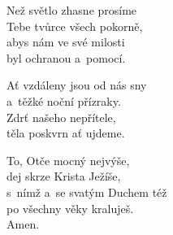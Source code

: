 \begin{translatioMulticol}{3}
Než světlo zhasne prosíme\\
Tebe tvůrce všech pokorně,\\
abys nám ve své milosti\\
byl ochranou a~pomocí.\columnbreak

Ať vzdáleny jsou od nás sny\\
a~těžké noční přízraky.\\
Zdrť našeho nepřítele,\\
těla poskvrn ať ujdeme.\columnbreak

To, Otče mocný nejvýše,\\
dej skrze Krista Ježíše,\\
s~nímž a~se svatým Duchem též\\
po všechny věky kraluješ.\\
Amen.
\end{translatioMulticol}
